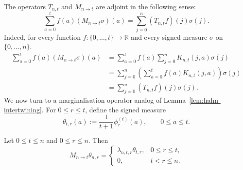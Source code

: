 \documentclass[manuscript,nonacm]{acmart}
\begin{document}
The operators $T_{n,t}$ and $M_{n\to t}$ are adjoint in the following sense:
\begin{equation}
\label{eq:T-M-adjoint-measures}
    \sum_{a=0}^t f(a)(M_{n\to t}\sigma)(a)
    =
    \sum_{j=0}^n (T_{n,t}f)(j)\sigma(j).
\end{equation}
Indeed, for every function
\(f:\{0,\dots,t\}\to\mathbb R\) and every signed measure
\(\sigma\) on \(\{0,\dots,n\}\).
\[
\begin{aligned}
    \sum_{a=0}^t f(a)(M_{n\to t}\sigma)(a)
    &=
    \sum_{a=0}^t
    f(a)
    \sum_{j=0}^n K_{n,t}(j,a)\sigma(j)          \\
    &=
    \sum_{j=0}^n
    \left(
        \sum_{a=0}^t f(a)K_{n,t}(j,a)
    \right)
    \sigma(j)                                  \\
    &=
    \sum_{j=0}^n (T_{n,t}f)(j)\sigma(j).
\end{aligned}
\]
We now turn to a marginalisation operator analog of Lemma~\ref{lem:hahn-intertwining}. For \(0\le r\le t\), define the signed measure
\begin{equation}
\label{eq:hahn-signed-measure}
    \theta_{t,r}(a)
    :=
    \frac{1}{t+1}\phi_r^{(t)}(a),
    \qquad 0\le a\le t.
\end{equation}

\begin{lemma}
\label{lem:hahn-measure-intertwining}
Let \(0\le t\le n\) and \(0\le r\le n\). Then
\[
    M_{n\to t}\theta_{n,r}
    =
    \begin{cases}
        \lambda_{n,t,r}\theta_{t,r},
            & 0\le r\le t,\\[1ex]
        0,
            & t<r\le n.
    \end{cases}
\]
\end{lemma}
\end{document}
